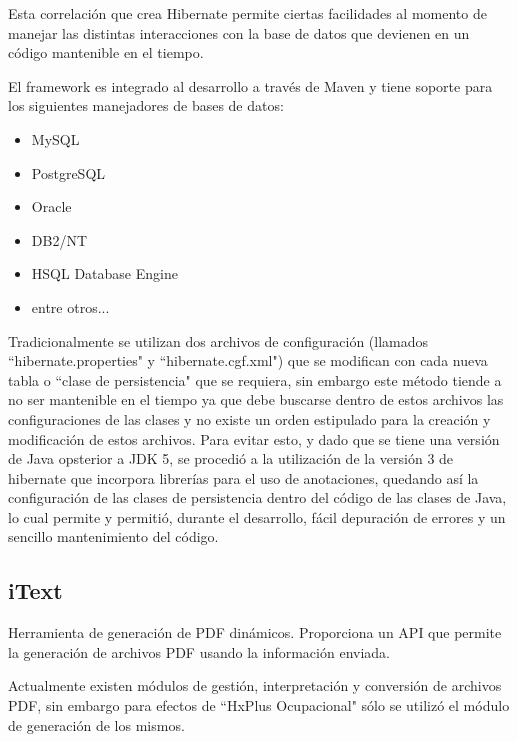         Esta correlación que crea Hibernate permite ciertas facilidades al momento de manejar las distintas interacciones con la base de datos que devienen en un código mantenible en el tiempo.
        
        El framework es integrado al desarrollo a través de Maven y tiene soporte para los siguientes manejadores de bases de datos\cite{HIBERNATE-tutorial}: 
        \begin{itemize}
            \item MySQL
            \item PostgreSQL
            \item Oracle
            \item DB2/NT
            \item HSQL Database Engine
            \item entre otros...
        \end{itemize}
        
        Tradicionalmente se utilizan dos archivos de configuración (llamados ``hibernate.properties" y ``hibernate.cgf.xml") que se modifican con cada nueva tabla o ``clase de persistencia" que se requiera, sin embargo este método tiende a no ser mantenible en el tiempo ya que debe buscarse dentro de estos archivos las configuraciones de las clases y no existe un orden estipulado para la creación y modificación de estos archivos. Para evitar esto, y dado que se tiene una versión de Java opsterior a JDK 5, se procedió a la utilización de la versión 3 de hibernate que incorpora librerías para el uso de anotaciones, quedando así la configuración de las clases de persistencia dentro del código de las clases de Java, lo cual permite y permitió, durante el desarrollo, fácil depuración de errores y un sencillo mantenimiento del código.
        
        \subsection{iText}
        \label{tecno-itext}
        
        Herramienta de generación de PDF dinámicos\cite{ITEXT-basico}. Proporciona un API que permite la generación de archivos PDF usando la información enviada.
        
        Actualmente existen módulos de gestión, interpretación y conversión de archivos PDF, sin embargo para efectos de ``HxPlus Ocupacional" sólo se utilizó el módulo de generación de los mismos.
        
